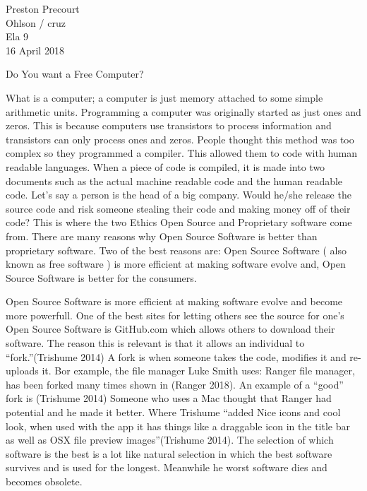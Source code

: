 \documentclass[12pt]{article}
\begin{document}
\begin{flushleft}

Preston Precourt\\
Ohlson / cruz\\
Ela 9\\
16 April 2018\\
\end{flushleft}

\begin{center}
Do You want a Free Computer?
\end{center}


\setlength{\parindent}{0.5in}


What is a computer; a computer is just memory attached to some simple arithmetic units.
Programming a computer was originally started as just ones and zeros. This is because
computers use transistors to process information and transistors can only process ones and
zeros. People thought this method was too complex so they programmed a compiler. This
allowed them to code with human readable languages. When a piece of code is compiled, it is
made into two documents such as the actual machine readable code and the human readable
code. Let’s say a person is the head of a big company. Would he/she release the source code
and risk someone stealing their code and making money off of their code? This is where the
two Ethics Open Source and Proprietary software come from. There are many reasons why
Open Source Software is better than proprietary software. Two of the best reasons are: Open
Source Software ( also known as free software ) is more efficient at making software evolve
and, Open Source Software is better for the consumers.

Open Source Software is more efficient at making software evolve and become more
powerfull. One of the best sites for letting others see the source for one’s Open Source
Software is GitHub.com which allows others to download their software. The reason this is
relevant is that it allows an individual to ``fork.''(Trishume 2014) A fork is when someone
takes the code, modifies it and re-uploads it. Bor example, the file manager Luke Smith
uses: Ranger file manager, has been forked many times shown in (Ranger 2018). An example
of a ``good'' fork is (Trishume 2014) Someone who uses a Mac thought that Ranger had
potential and he made it better. Where Trishume ``added Nice icons and cool look, when
used with the app it has things like a draggable icon in the title bar as well as OSX file
preview images''(Trishume 2014). The selection of which software is the best is a lot like
natural selection in which the best software survives and is used for the longest. Meanwhile
he worst software dies and becomes obsolete.
\end{document}
